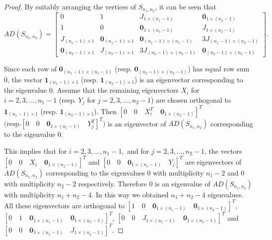\documentclass[12pt]{article}
\numberwithin{equation}{section}
\begin{document}
	\begin{proof}
	By suitably arranging the vertices of $S_{n_1,n_2}$, it can be seen that
		\[AD(S_{n_1,n_2})=\begin{bmatrix}
		0 & 1 & J_{1 \times (n_1-1)} & \bm{0}_{1 \times (n_2-1)}\\
		1 & 0 & \bm{0}_{1 \times (n_1 - 1)} & J_{1 \times (n_2 -1)}\\

		J_{(n_1 - 1) \times 1} & \bm{0}_{(n_1-1) \times 1} & \bm{0}_{(n_1-1) \times (n_1-1)} & 3J_{(n_1-1) \times (n_2-1)}\\
		\bm{0}_{(n_2-1) \times 1} & J_{(n_2-1) \times 1} & 3J_{(n_2-1) \times (n_1-1)} & \bm{0}_{(n_2-1) \times (n_2-1)}
		\end{bmatrix}.\]
		

		
		Since each row of $\bm{0}_{(n_1-1) \times (n_1-1)}$ (resp. $\bm{0}_{(n_2-1) \times (n_2-1)}$) has equal row sum $0$, the vector $\bm{1}_{(n_1-1) \times 1}$ (resp. $\bm{1}_{(n_2-1) \times 1}$) is an eigenvector corresponding to the eigenvalue $0$. Assume that the remaining eigenvectors $X_i$ for $i=2,3,\dots,n_1-1$ (resp. $Y_j$ for $j=2,3,\dots,n_2-1$) are chosen orthogonal to $\bm{1}_{(n_1-1) \times 1}$ (resp. $\bm{1}_{(n_2-1) \times 1}$). 
		Then $ \left[
		0 \quad 0 \quad X^T_i \quad \bm{0}_{1 \times (n_2-1)}
		\right]^T$ 
		$\big(\text{resp.} \left[
			0 \quad  0 \quad \bm{0}_{1 \times (n_1-1)} \quad Y^T_j
		\right]^T\big)$
       is an eigenvector of $AD(S_{n_1,n_2})$ corresponding to the eigenvalue $0$.
			
		
		This implies that for $i=2,3,\dots,n_1-1,$ and for $j=2,3,\dots,n_2-1$, the vectors
		$\left[
		0 \quad 0 \quad X_i \quad \bm{0}_{1 \times (n_2-1)}
		\right]^T$ and 
		$\left[
	 0 \quad 0 \quad \bm{0}_{1 \times (n_1-1)} \quad Y_j
	 \right]^T$ are eigenvectors of $AD(S_{n_1,n_2})$ corresponding to the eigenvalues $0$ with multiplicity $n_1-2$ and $0$ with multiplicity $n_2-2$ respectively. Therefore $0$ is an eigenvalue of $AD(S_{n_1,n_2})$ with multiplicity $n_1+n_2-4$. In this way we obtained $n_1+n_2-4$ eigenvalues. 		  
	 All these eigenvectors are orthogonal to $\left[
	 1 \quad 0 \quad \bm{0}_{1 \times (n_1-1)} \quad \bm{0}_{1 \times (n_2-1)}
	 \right]^T$,
	 $\left[
	 0 \quad 1 \quad \bm{0}_{1 \times (n_1-1)} \quad \bm{0}_{1 \times (n_2-1)}
	\right]^T$,
	  $\left[
	 0 \quad 0 \quad J_{1 \times (n_1-1)} \quad \bm{0}_{1 \times (n_2-1)}
	\right]^T$ 	 	 and 	 	 $\left[
	 	0 \quad 0 \quad \bm{0}_{1 \times (n_1-1)} \quad J_{1 \times (n_2-1)}
	\right]^T$. 
	 

\end{proof}
\end{document}
